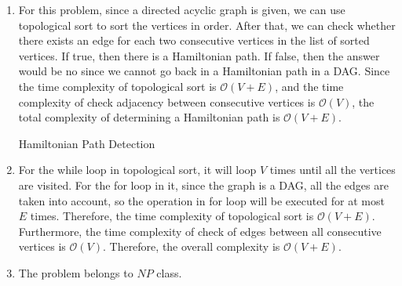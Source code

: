 \documentclass[12pt, a4paper]{article}
\begin{document}
\begin{enumerate}
\begin{algorithm}[!htb]
{                  

                  \;
              }
          \end{algorithm}
          \newpage
    \item For this problem, since a directed acyclic graph is given, we can use topological sort to sort the vertices in order. 
          After that, we can check whether there exists an edge for each two consecutive vertices in the list of sorted vertices. 
          If true, then there is a Hamiltonian path. If false, 
          then the answer would be no since we cannot go back in a Hamiltonian path in a DAG. 
          Since the time complexity of topological sort is $\mathcal{O}(V+E)$, 
          and the time complexity of check adjacency between consecutive vertices is $\mathcal{O}(V)$, 
          the total complexity of determining a Hamiltonian path is $\mathcal{O}(V+E)$.

          \begin{algorithm}[!htb]
              \caption{Hamiltonian Path Detection}
              \BlankLine
          \end{algorithm}

    \newpage
    \item For the while loop in topological sort, it will loop $V$ times until all the vertices are visited. 
          For the for loop in it, since the graph is a DAG, all the edges are taken into account, 
          so the operation in for loop will be executed for at most $E$ times. Therefore, 
          the time complexity of topological sort is $\mathcal{O}(V+E)$. 
          Furthermore, the time complexity of check of edges between all consecutive vertices is $\mathcal{O}(V)$. 
          Therefore, the overall complexity is $\mathcal{O}(V+E)$.
    
    \item The problem belongs to $NP$ class.
\end{enumerate}
\end{document}
